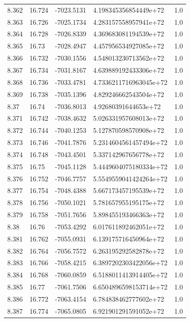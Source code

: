 \begin{tabular}{lllll}
8.362 & 16.724 & -7023.5131 & 4.198345356854449e+72 & 1.0 \\
8.363 & 16.726 & -7025.1734 & 4.283157558957941e+72 & 1.0 \\
8.364 & 16.728 & -7026.8339 & 4.369683081194539e+72 & 1.0 \\
8.365 & 16.73 & -7028.4947 & 4.457956534927085e+72 & 1.0 \\
8.366 & 16.732 & -7030.1556 & 4.548013230713562e+72 & 1.0 \\
8.367 & 16.734 & -7031.8167 & 4.639889192433306e+72 & 1.0 \\
8.368 & 16.736 & -7033.4781 & 4.7336211716963045e+72 & 1.0 \\
8.369 & 16.738 & -7035.1396 & 4.829246662543504e+72 & 1.0 \\
8.37 & 16.74 & -7036.8013 & 4.92680391644653e+72 & 1.0 \\
8.371 & 16.742 & -7038.4632 & 5.026331957608013e+72 & 1.0 \\
8.372 & 16.744 & -7040.1253 & 5.127870598570908e+72 & 1.0 \\
8.373 & 16.746 & -7041.7876 & 5.2314604561457494e+72 & 1.0 \\
8.374 & 16.748 & -7043.4501 & 5.337142967656778e+72 & 1.0 \\
8.375 & 16.75 & -7045.1128 & 5.4449604075180334e+72 & 1.0 \\
8.376 & 16.752 & -7046.7757 & 5.5549559041424264e+72 & 1.0 \\
8.377 & 16.754 & -7048.4388 & 5.667173457195539e+72 & 1.0 \\
8.378 & 16.756 & -7050.1021 & 5.781657955195175e+72 & 1.0 \\
8.379 & 16.758 & -7051.7656 & 5.898455193466363e+72 & 1.0 \\
8.38 & 16.76 & -7053.4292 & 6.017611892462051e+72 & 1.0 \\
8.381 & 16.762 & -7055.0931 & 6.139175716450964e+72 & 1.0 \\
8.382 & 16.764 & -7056.7572 & 6.263195292582878e+72 & 1.0 \\
8.383 & 16.766 & -7058.4215 & 6.3897202303422056e+72 & 1.0 \\
8.384 & 16.768 & -7060.0859 & 6.5188011413914405e+72 & 1.0 \\
8.385 & 16.77 & -7061.7506 & 6.6504896598153714e+72 & 1.0 \\
8.386 & 16.772 & -7063.4154 & 6.784838462777602e+72 & 1.0 \\
8.387 & 16.774 & -7065.0805 & 6.921901291591052e+72 & 1.0 \\

\end{tabular}
